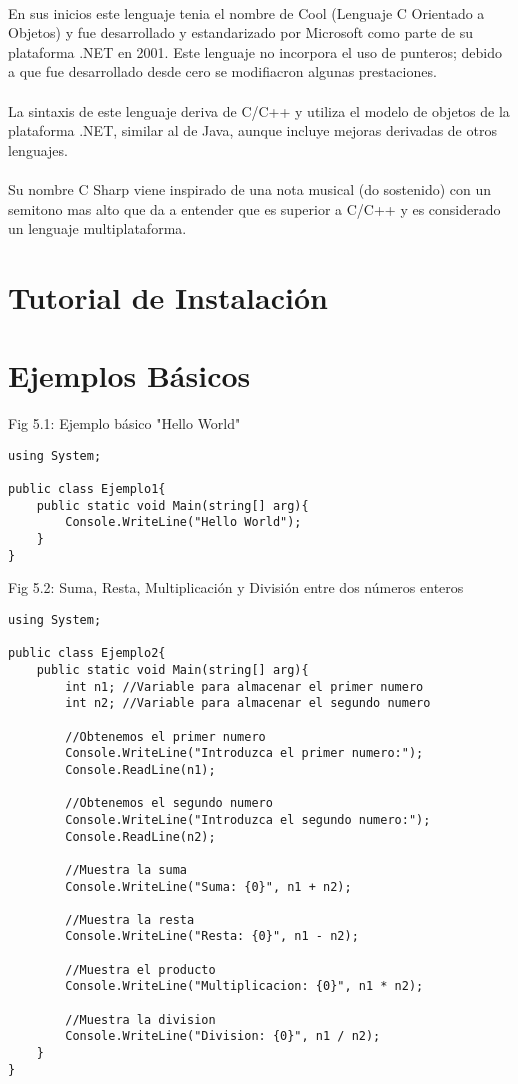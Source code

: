 \documentclass[11pt]{article} %
\begin{document}
\paragraph{ }
En sus inicios este lenguaje tenia el nombre de Cool (Lenguaje C Orientado a Objetos) y fue desarrollado y estandarizado por Microsoft como parte de su plataforma .NET en 2001. Este lenguaje no incorpora el uso de punteros; debido a que fue desarrollado desde cero se modifiacron algunas prestaciones.
\paragraph{ }
La sintaxis de este lenguaje deriva de C/C++ y utiliza el modelo de objetos de la plataforma .NET, similar al de Java, aunque incluye mejoras derivadas de otros lenguajes.
\paragraph{ }
Su nombre C Sharp viene inspirado de una nota musical (do sostenido) con un semitono mas alto que da a entender que es superior a  C/C++ y es considerado un lenguaje multiplataforma.

\section{Tutorial de Instalación}


\section{Ejemplos Básicos}


Fig 5.1: Ejemplo básico "Hello World"
\lstset{style=sharpc}
\begin{lstlisting}[frame=single]
using System;

public class Ejemplo1{
	public static void Main(string[] arg){
		Console.WriteLine("Hello World");
	}
}
\end{lstlisting}

Fig 5.2: Suma, Resta, Multiplicación y División entre dos números enteros
\begin{lstlisting}[frame=single]
using System;

public class Ejemplo2{
	public static void Main(string[] arg){
		int n1;	//Variable para almacenar el primer numero
		int n2;	//Variable para almacenar el segundo numero
		
		//Obtenemos el primer numero
		Console.WriteLine("Introduzca el primer numero:");
		Console.ReadLine(n1);
		
		//Obtenemos el segundo numero
		Console.WriteLine("Introduzca el segundo numero:");		
		Console.ReadLine(n2);
		
		//Muestra la suma
		Console.WriteLine("Suma: {0}", n1 + n2);
		
		//Muestra la resta		
		Console.WriteLine("Resta: {0}", n1 - n2);
		
		//Muestra el producto		
		Console.WriteLine("Multiplicacion: {0}", n1 * n2);
		
		//Muestra la division		
		Console.WriteLine("Division: {0}", n1 / n2);
	}
}
\end{lstlisting}
\end{document}

